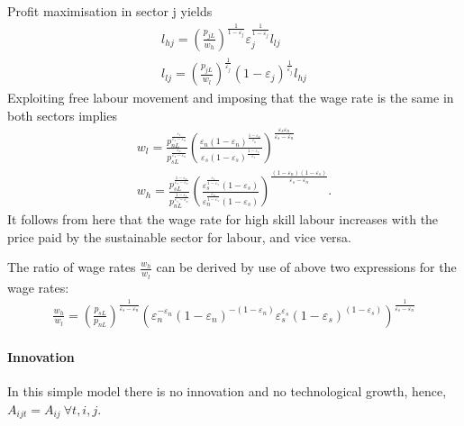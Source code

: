 Profit maximisation in sector j yields
\begin{align*}
l_{hj}= \left(\frac{p_{jL}}{w_h}\right)^{\frac{1}{1-\varepsilon_j}}\varepsilon_j^{\frac{1}{1-\varepsilon_j}}l_{lj}\\
l_{lj}= \left(\frac{p_{jL}}{w_l}\right)^\frac{1}{\varepsilon_j}(1-\varepsilon_j)^\frac{1}{\varepsilon_j}l_{hj}
\end{align*}
Exploiting free labour movement and imposing that the wage rate is the same in both sectors implies
\begin{align*}
 w_l= \frac{p_{nL}^\frac{\varepsilon_s}{\varepsilon_s-\varepsilon_n}}{p_{sL}^\frac{\varepsilon_n}{\varepsilon_s-\varepsilon_n}}\left(\frac{\varepsilon_n(1-\varepsilon_n)^\frac{1-\varepsilon_n}{\varepsilon_n}}{\varepsilon_s(1-\varepsilon_s)^\frac{1-\varepsilon_s}{\varepsilon_s}}\right)^\frac{\varepsilon_s\varepsilon_n}{\varepsilon_s-\varepsilon_n}\\
 w_h= \frac{p_{sL}^\frac{1-\varepsilon_n}{\varepsilon_s-\varepsilon_n}}{p_{nL}^\frac{1-\varepsilon_s}{\varepsilon_s-\varepsilon_n}}\left(\frac{\varepsilon_s^\frac{\varepsilon_s}{1-\varepsilon_s}(1-\varepsilon_s)}{\varepsilon_n^\frac{\varepsilon_n}{1-\varepsilon_s}(1-\varepsilon_s)}\right)^\frac{(1-\varepsilon_n)(1-\varepsilon_s)}{\varepsilon_s-\varepsilon_n}.
\end{align*}
It follows from here that the wage rate for high skill labour increases with the price paid by the sustainable sector for labour, and vice versa. 

The ratio of wage rates $\frac{w_h}{w_l}$ can be derived by use of above two expressions for the wage rates:
\begin{align}
\frac{w_h}{w_l}=\left(\frac{p_{sL}}{p_{nL}}\right)^\frac{1}{\varepsilon_s-\varepsilon_n}\left(\varepsilon_n^{-\varepsilon_n} (1-\varepsilon_n)^{-(1-\varepsilon_n)}\varepsilon_s^{\varepsilon_s} (1-\varepsilon_s)^{(1-\varepsilon_s)} \right)^\frac{1}{\varepsilon_s-\varepsilon_n}\label{eq:labourFirm_labrel}
\end{align}

\paragraph{Innovation}
In this simple model there is no innovation and no technological growth, hence, $A_{ijt}=A_{ij}\ \forall t, i, j$.


